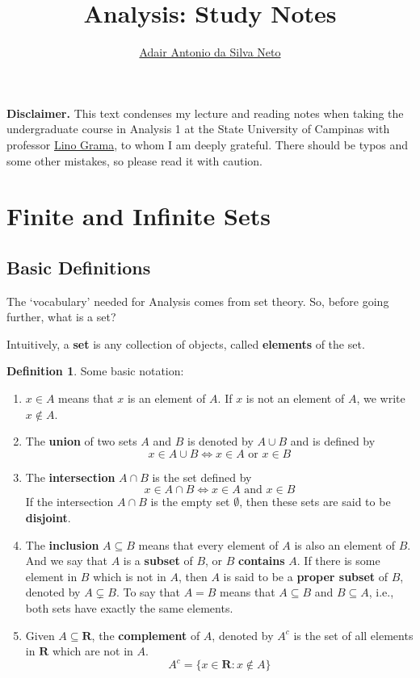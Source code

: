 \documentclass[tikz,12pt,a4paper]{article}
\author{\href{https://github.com/adairneto}{Adair Antonio da Silva Neto}}
\title{Analysis: Study Notes}
\theoremstyle{definition}
\newtheorem{definition}{Definition}[section]
\begin{document}
\clearpage\maketitle
\thispagestyle{empty}

\newpage

\tableofcontents

\newpage
\clearpage
\setcounter{page}{1}

\textbf{Disclaimer.} This text condenses my lecture and reading notes when taking the undergraduate course in Analysis 1 at the State University of Campinas with professor \href{https://sites.google.com/unicamp.br/linograma/home}{Lino Grama}, to whom I am deeply grateful. There should be typos and some other mistakes, so please read it with caution.

\section{Finite and Infinite Sets}

\subsection{Basic Definitions}

The `vocabulary' needed for Analysis comes from set theory. So, before going further, what is a set?

Intuitively, a \textbf{set} is any collection of objects, called \textbf{elements} of the set.

\begin{definition}
	Some basic notation:
	\begin{enumerate}
		\item $x \in A$ means that $x$ is an element of $A$. If $x$ is not an element of $A$, we write $x \notin A$.
		\item The \textbf{union} of two sets $A$ and $B$ is denoted by $A \cup B$ and is defined by \[ x \in A \cup B \iff x \in A \text{ or } x \in B \]
		\item The \textbf{intersection} $A \cap B$ is the set defined by \[ x \in A \cap B \iff x \in A \text{ and } x \in B \] If the intersection $A \cap B$ is the empty set $\emptyset$, then these sets are said to be \textbf{disjoint}.
		\item The \textbf{inclusion} $A \subseteq B$ means that every element of $A$ is also an element of $B$. And we say that $A$ is a \textbf{subset} of $B$, or $B$ \textbf{contains} $A$. If there is some element in $B$ which is not in $A$, then $A$ is said to be a \textbf{proper subset} of $B$, denoted by $A \subsetneq B$. To say that $A = B$ means that $A \subseteq B$ and $B \subseteq A$, i.e., both sets have exactly the same elements.
		\item Given $A \subseteq \textbf{R}$, the \textbf{complement} of $A$, denoted by $A^c$ is the set of all elements in $\textbf{R}$ which are not in $A$. \[ A^c = \{ x \in \textbf{R} : x \notin A \} \]
	\end{enumerate}
\end{definition}
\end{document}
